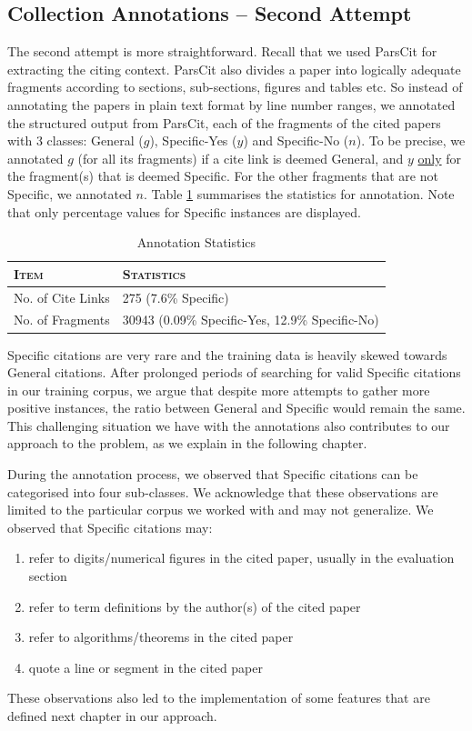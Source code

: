 \subsection*{Collection Annotations -- Second Attempt}
The second attempt is more straightforward. Recall that we used ParsCit for extracting the citing context. ParsCit also divides a paper into logically adequate fragments according to sections, sub-sections, figures and tables etc. So instead of annotating the papers in plain text format by line number ranges, we annotated the structured output from ParsCit, each of the fragments of the cited papers with 3 classes: General ($g$), Specific-Yes ($y$) and Specific-No ($n$). To be precise, we annotated $g$ (for all its fragments) if a cite link is deemed General, and $y$ \underline{only} for the fragment(s) that is deemed Specific. For the other fragments that are not Specific, we annotated $n$. Table \ref{tab:annotation} summarises the statistics for annotation. Note that only percentage values for Specific instances are displayed.

\begin{table}[h]
	\center
	\begin{tabular}{ l | l}
		\textsc{Item} & \textsc{Statistics}\\
		\hline
		No. of Cite Links & 275 (7.6\% Specific) \\
		No. of Fragments & 30943 (0.09\% Specific-Yes, 12.9\% Specific-No)
	\end{tabular}
	\caption{Annotation Statistics}
	\label{tab:annotation}
\end{table}

Specific citations are very rare and the training data is heavily skewed towards General citations. After prolonged periods of searching for valid Specific citations in our training corpus, we argue that despite more attempts to gather more positive instances, the ratio between General and Specific would remain the same. This challenging situation we have with the annotations also contributes to our approach to the problem, as we explain in the following chapter.

During the annotation process, we observed that Specific citations can be categorised into four sub-classes.  We acknowledge that these observations are limited to the particular corpus we worked with and may not generalize.  We observed that Specific citations may:
\begin{enumerate}
\item refer to digits/numerical figures in the cited paper, usually in the evaluation section
\item refer to term definitions by the author(s) of the cited paper
\item refer to algorithms/theorems in the cited paper
\item quote a line or segment in the cited paper
\end{enumerate}
These observations also led to the implementation of some features that are defined next chapter in our approach.
